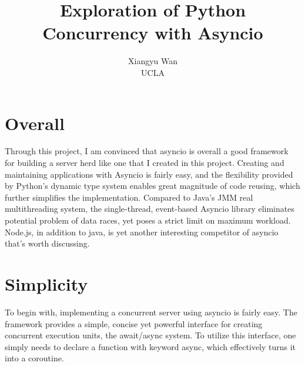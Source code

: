 \documentclass[letterpaper,twocolumn,10pt]{article}
\begin{document}

\date{}

\title{\Large \bf Exploration of Python Concurrency with Asyncio}

\author{
{\rm Xiangyu Wan}\\
UCLA
} %

\maketitle


\section{Overall}

Through this project, I am convinced that asyncio is overall a good framework for building a server herd like one that I created in this project.
Creating and maintaining applications with Asyncio is fairly easy, and the flexibility provided by Python's dynamic type system enables great magnitude of code reusing, which further simplifies the implementation.
Compared to Java's JMM real multithreading system, the single-thread, event-based Asyncio library eliminates potential problem of data races, yet poses a strict limit on maximum workload.
Node.js, in addition to java, is yet another interesting competitor of asyncio that's worth discussing.

\section{Simplicity}

To begin with, implementing a concurrent server using asyncio is fairly easy. 
The framework provides a simple, concise yet powerful interface for creating concurrent execution units, the await/async system. 
To utilize this interface, one simply needs to declare a function with keyword async, which effectively turns it into a coroutine. 
\end{document}
